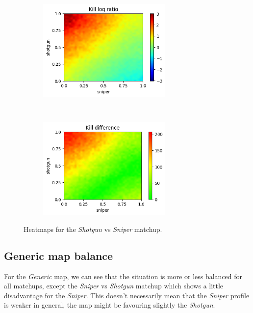 \begin{figure}[H]
    \centering
    \begin{subfigure}[t]{0.5\textwidth}
        \centering
        \includegraphics[height=5cm]{Images/images/heatmaps/short-range/shotgun_sniper_heatmap_ratio.png}
    \end{subfigure}%
    ~ 
    \begin{subfigure}[t]{0.5\textwidth}
        \centering
        \includegraphics[height=5cm]{Images/images/heatmaps/short-range/shotgun_sniper_heatmap_diff.png}
    \end{subfigure}
    \caption{Heatmaps for the \textit{Shotgun} vs \textit{Sniper} matchup.}
    \label{fig:balance_shotgun_sniper_short}
\end{figure}

\subsection{Generic map balance}
For the \textit{Generic} map, we can see that the situation is more or less balanced for all matchups, except the \textit{Sniper} vs \textit{Shotgun} matchup which shows a little disadvantage for the \textit{Sniper}. This doesn't necessarily mean that the \textit{Sniper} profile is weaker in general, the map might be favouring slightly the \textit{Shotgun}.

